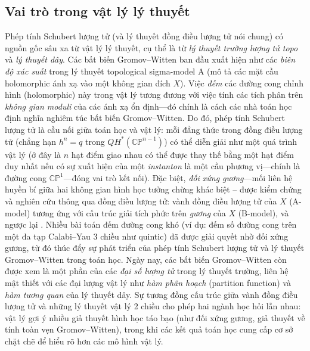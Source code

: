 \subsection{Vai trò trong vật lý lý thuyết}
Phép tính Schubert lượng tử (và lý thuyết đồng điều lượng tử nói chung) có nguồn gốc sâu xa từ vật lý lý thuyết, cụ thể là từ \textit{lý thuyết trường lượng tử topo} và \textit{lý thuyết dây}. Các bất biến Gromov–Witten ban đầu xuất hiện như các \textit{biên độ xác suất} trong lý thuyết topological sigma-model A (mô tả các mặt cầu holomorphic ánh xạ vào một không gian đích $X$). Việc \textit{đếm} các đường cong chỉnh hình (holomorphic) này trong vật lý tương đương với việc tính các tích phân trên \textit{không gian moduli} của các ánh xạ ổn định---đó chính là cách các nhà toán học định nghĩa nghiêm túc bất biến Gromov–Witten. Do đó, phép tính Schubert lượng tử là cầu nối giữa toán học và vật lý: mỗi đẳng thức trong đồng điều lượng tử (chẳng hạn $h^{n} = q$ trong $QH^*(\mathbb{CP}^{n-1})$) có thể diễn giải như một quá trình vật lý (ở đây là $n$ hạt điểm giao nhau có thể được thay thế bằng một hạt điểm duy nhất nếu có sự xuất hiện của một \textit{instanton} là một cầu phương vị---chính là đường cong $\mathbb{CP}^1$---đóng vai trò kết nối). Đặc biệt, \textit{đối xứng gương}---mối liên hệ huyền bí giữa hai không gian hình học tưởng chừng khác biệt – được kiểm chứng và nghiên cứu thông qua đồng điều lượng tử: vành đồng điều lượng tử của $X$ (A-model) tương ứng với cấu trúc giải tích phức trên \textit{gương} của $X$ (B-model), và ngược lại \cite{nlab:gromov-witten_invariants}. Nhiều bài toán đếm đường cong khó (ví dụ: đếm số đường cong trên một đa tạp Calabi–Yau 3 chiều như quintic) đã được giải quyết nhờ đối xứng gương, từ đó thúc đẩy sự phát triển của phép tính Schubert lượng tử và lý thuyết Gromov–Witten trong toán học. Ngày nay, các bất biến Gromov–Witten còn được xem là một phần của các \textit{đại số lượng tử} trong lý thuyết trường, liên hệ mật thiết với các đại lượng vật lý như \textit{hàm phân hoạch} (partition function) và \textit{hàm tương quan} của lý thuyết dây. Sự tương đồng cấu trúc giữa vành đồng điều lượng tử và những lý thuyết vật lý 2 chiều cho phép hai ngành học hỏi lẫn nhau: vật lý gợi ý nhiều giả thuyết hình học táo bạo (như đối xứng gương, giả thuyết về tính toàn vẹn Gromov–Witten), trong khi các kết quả toán học cung cấp cơ sở chặt chẽ để hiểu rõ hơn các mô hình vật lý.
